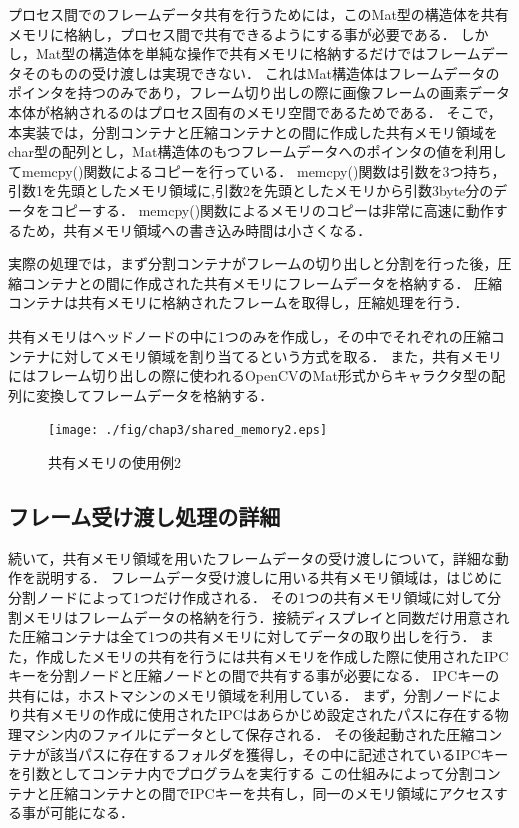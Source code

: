 プロセス間でのフレームデータ共有を行うためには，このMat型の構造体を共有メモリに格納し，プロセス間で共有できるようにする事が必要である．
しかし，Mat型の構造体を単純な操作で共有メモリに格納するだけではフレームデータそのものの受け渡しは実現できない．
これはMat構造体はフレームデータのポインタを持つのみであり，フレーム切り出しの際に画像フレームの画素データ本体が格納されるのはプロセス固有のメモリ空間であるためである．
そこで，本実装では，分割コンテナと圧縮コンテナとの間に作成した共有メモリ領域をchar型の配列とし，Mat構造体のもつフレームデータへのポインタの値を利用してmemcpy()関数によるコピーを行っている．
memcpy()関数は引数を3つ持ち，引数1を先頭としたメモリ領域に,引数2を先頭としたメモリから引数3byte分のデータをコピーする．
memcpy()関数によるメモリのコピーは非常に高速に動作するため，共有メモリ領域への書き込み時間は小さくなる．

実際の処理では，まず分割コンテナがフレームの切り出しと分割を行った後，圧縮コンテナとの間に作成された共有メモリにフレームデータを格納する．
圧縮コンテナは共有メモリに格納されたフレームを取得し，圧縮処理を行う．

共有メモリはヘッドノードの中に1つのみを作成し，その中でそれぞれの圧縮コンテナに対してメモリ領域を割り当てるという方式を取る．
また，共有メモリにはフレーム切り出しの際に使われるOpenCVのMat形式からキャラクタ型の配列に変換してフレームデータを格納する．

\begin{figure}[H]
    \hspace*{\fill}
    \texttt{[image: ./fig/chap3/shared\_memory2.eps]}
    \hspace*{\fill}
    \caption{共有メモリの使用例2}
\end{figure}

\subsection*{フレーム受け渡し処理の詳細}

続いて，共有メモリ領域を用いたフレームデータの受け渡しについて，詳細な動作を説明する．
フレームデータ受け渡しに用いる共有メモリ領域は，はじめに分割ノードによって1つだけ作成される．
その1つの共有メモリ領域に対して分割メモリはフレームデータの格納を行う．接続ディスプレイと同数だけ用意された圧縮コンテナは全て1つの共有メモリに対してデータの取り出しを行う．
また，作成したメモリの共有を行うには共有メモリを作成した際に使用されたIPCキーを分割ノードと圧縮ノードとの間で共有する事が必要になる．
IPCキーの共有には，ホストマシンのメモリ領域を利用している．
まず，分割ノードにより共有メモリの作成に使用されたIPCはあらかじめ設定されたパスに存在する物理マシン内のファイルにデータとして保存される．
その後起動された圧縮コンテナが該当パスに存在するフォルダを獲得し，その中に記述されているIPCキーを引数としてコンテナ内でプログラムを実行する
この仕組みによって分割コンテナと圧縮コンテナとの間でIPCキーを共有し，同一のメモリ領域にアクセスする事が可能になる．

